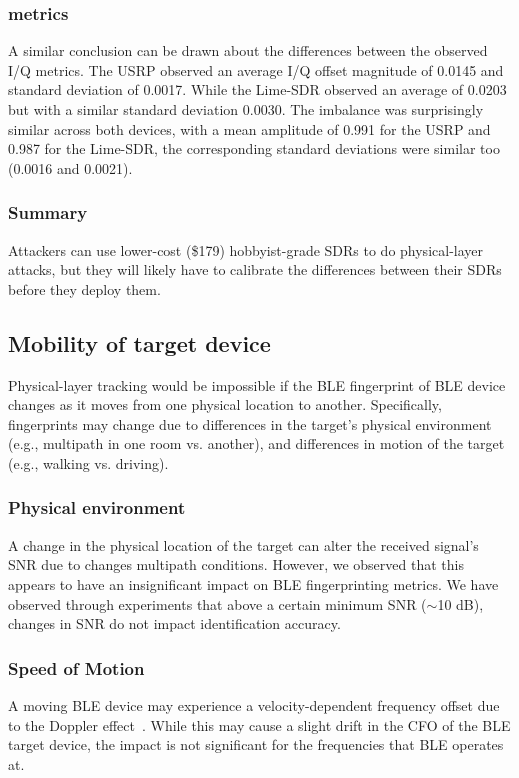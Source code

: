 \subsubsection*{\iq metrics} A similar conclusion can be drawn about the
differences between the observed I/Q metrics. The USRP observed an average I/Q
offset magnitude of 0.0145 and standard deviation of 0.0017. While the Lime-SDR
observed an average of 0.0203 but with a similar standard deviation 0.0030. 
The \iq imbalance was surprisingly similar across both devices, with a mean
amplitude of 0.991 for the USRP and 0.987 for the Lime-SDR, the corresponding standard deviations
were similar too (0.0016 and 0.0021).

\subsubsection*{Summary} Attackers can use lower-cost (\$179) hobbyist-grade
SDRs to do physical-layer attacks, but they will likely have to calibrate the
differences between their SDRs before they deploy them.

\subsection{Mobility of target device} %
\label{sec:hadi:mobility}

Physical-layer tracking would be impossible if the BLE fingerprint of BLE device
changes as it moves from one physical location to another.  Specifically,
fingerprints may change due to differences in the target's physical environment
(e.g., multipath in one room vs. another), and differences in
motion of the target (e.g., walking vs. driving).
    
\subsubsection*{Physical environment} A change in the physical location of the
target can alter the received signal's SNR due to changes
multipath conditions. However, we observed that this appears to have 
an insignificant impact on BLE fingerprinting metrics. 
%
We have observed through experiments that above a
certain minimum SNR ($\sim$10 dB), changes in SNR do not impact
identification accuracy.

\subsubsection*{Speed of Motion} A moving BLE device may experience a
velocity-dependent frequency offset due to the Doppler
effect~\cite{nasadoppler}. While this may cause a slight drift in the CFO of
the BLE target device, the impact is not significant for the frequencies that
BLE operates at. 

